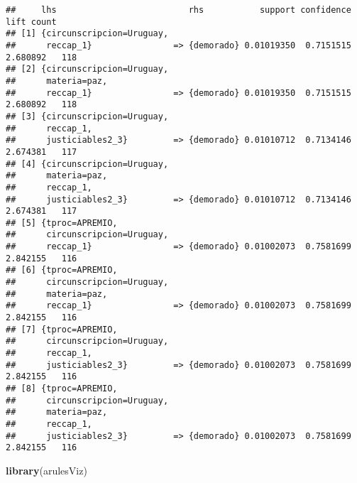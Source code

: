 \documentclass[runningheads,a4paper]{llncs}
\newenvironment{Shaded}{}{}
\newcommand{\KeywordTok}[1]{\textcolor[rgb]{0.00,0.44,0.13}{\textbf{{#1}}}}
\newcommand{\NormalTok}[1]{{#1}}
\begin{document}
\begin{verbatim}
##     lhs                          rhs           support confidence     lift count
## [1] {circunscripcion=Uruguay,                                                   
##      reccap_1}                => {demorado} 0.01019350  0.7151515 2.680892   118
## [2] {circunscripcion=Uruguay,                                                   
##      materia=paz,                                                               
##      reccap_1}                => {demorado} 0.01019350  0.7151515 2.680892   118
## [3] {circunscripcion=Uruguay,                                                   
##      reccap_1,                                                                  
##      justiciables2_3}         => {demorado} 0.01010712  0.7134146 2.674381   117
## [4] {circunscripcion=Uruguay,                                                   
##      materia=paz,                                                               
##      reccap_1,                                                                  
##      justiciables2_3}         => {demorado} 0.01010712  0.7134146 2.674381   117
## [5] {tproc=APREMIO,                                                             
##      circunscripcion=Uruguay,                                                   
##      reccap_1}                => {demorado} 0.01002073  0.7581699 2.842155   116
## [6] {tproc=APREMIO,                                                             
##      circunscripcion=Uruguay,                                                   
##      materia=paz,                                                               
##      reccap_1}                => {demorado} 0.01002073  0.7581699 2.842155   116
## [7] {tproc=APREMIO,                                                             
##      circunscripcion=Uruguay,                                                   
##      reccap_1,                                                                  
##      justiciables2_3}         => {demorado} 0.01002073  0.7581699 2.842155   116
## [8] {tproc=APREMIO,                                                             
##      circunscripcion=Uruguay,                                                   
##      materia=paz,                                                               
##      reccap_1,                                                                  
##      justiciables2_3}         => {demorado} 0.01002073  0.7581699 2.842155   116
\end{verbatim}

\begin{Shaded}
\begin{Highlighting}[]
\KeywordTok{library}\NormalTok{(arulesViz)}
\end{Highlighting}
\end{Shaded}
\end{document}
